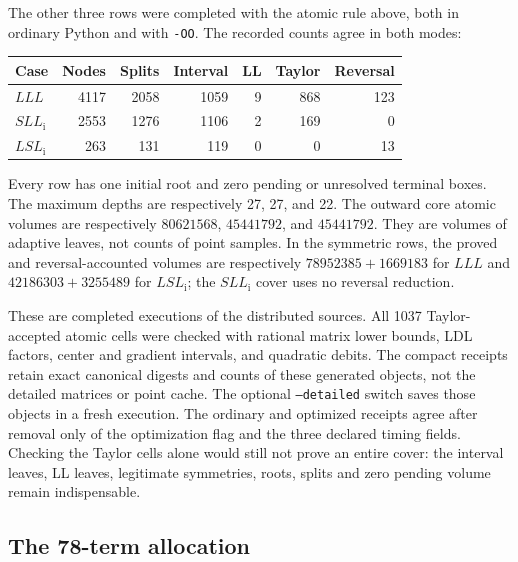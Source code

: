 \documentclass[11pt]{amsart}
\numberwithin{equation}{section}
\begin{document}
The other three rows were completed with the atomic rule above,
both in ordinary Python and with \texttt{-OO}. The recorded
counts agree in both modes:
\begin{center}\small
\begin{tabular}{@{}lrrrrrr@{}}
\toprule
Case & Nodes & Splits & Interval & LL & Taylor & Reversal\\
\midrule
$LLL$ & 4117 & 2058 & 1059 & 9 & 868 & 123\\
$SLL_{\mathrm i}$ & 2553 & 1276 & 1106 & 2 & 169 & 0\\
$LSL_{\mathrm i}$ & 263 & 131 & 119 & 0 & 0 & 13\\
\bottomrule
\end{tabular}
\end{center}
Every row has one initial root and zero pending or unresolved
terminal boxes. The maximum depths are respectively 27, 27, and
22. The outward core atomic volumes are respectively
$80621568$, $45441792$, and $45441792$. They are volumes of
adaptive leaves, not counts of point samples. In the symmetric
rows, the proved and reversal-accounted volumes are respectively
$78952385+1669183$ for $LLL$ and
$42186303+3255489$ for $LSL_{\mathrm i}$; the $SLL_{\mathrm i}$
cover uses no reversal reduction.

These are completed executions of the distributed sources. All
1037 Taylor-accepted atomic cells were checked with rational matrix
lower bounds, LDL factors, center and gradient intervals, and
quadratic debits. The compact receipts retain exact canonical
digests and counts of these generated objects, not the detailed
matrices or point cache. The optional \texttt{--detailed} switch
saves those objects in a fresh execution. The ordinary and optimized
receipts agree after removal only of the optimization flag and
the three declared timing fields. Checking the Taylor cells alone
would still not prove an entire cover: the interval leaves, LL
leaves, legitimate symmetries, roots, splits and zero pending volume
remain indispensable.

\subsection{The 78-term allocation}
\end{document}

